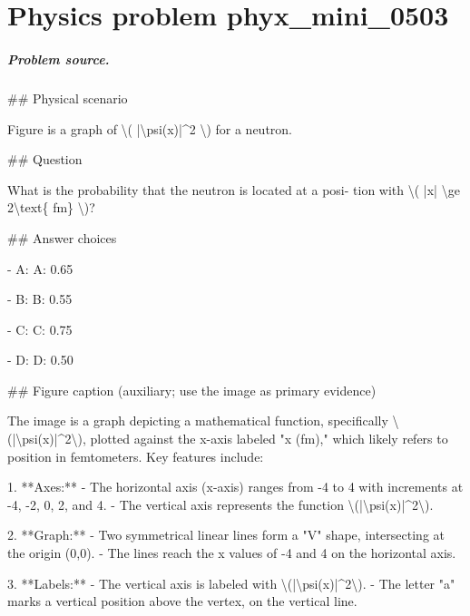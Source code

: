 
\chapter{Physics problem phyx\_mini\_0503}
\label{ch:PhyXMiniProblems_problem_phyx_mini_0503}

\paragraph{Problem source.}
\#\# Physical scenario

Figure is a graph of \textbackslash{}( |\textbackslash{}psi(x)|\textasciicircum{}2 \textbackslash{}) for a neutron.

\#\# Question

What is the probability that the neutron is located at a posi- tion with \textbackslash{}( |x| \textbackslash{}ge 2\textbackslash{}text\{ fm\} \textbackslash{})?

\#\# Answer choices

- A: A: 0.65

- B: B: 0.55

- C: C: 0.75

- D: D: 0.50

\#\# Figure caption (auxiliary; use the image as primary evidence)

The image is a graph depicting a mathematical function, specifically \textbackslash{}(|\textbackslash{}psi(x)|\textasciicircum{}2\textbackslash{}), plotted against the x-axis labeled "x (fm)," which likely refers to position in femtometers. Key features include:

1. **Axes:**
   - The horizontal axis (x-axis) ranges from -4 to 4 with increments at -4, -2, 0, 2, and 4.
   - The vertical axis represents the function \textbackslash{}(|\textbackslash{}psi(x)|\textasciicircum{}2\textbackslash{}).

2. **Graph:**
   - Two symmetrical linear lines form a "V" shape, intersecting at the origin (0,0).
   - The lines reach the x values of -4 and 4 on the horizontal axis.

3. **Labels:**
   - The vertical axis is labeled with \textbackslash{}(|\textbackslash{}psi(x)|\textasciicircum{}2\textbackslash{}).
   - The letter "a" marks a vertical position above the vertex, on the vertical line.

